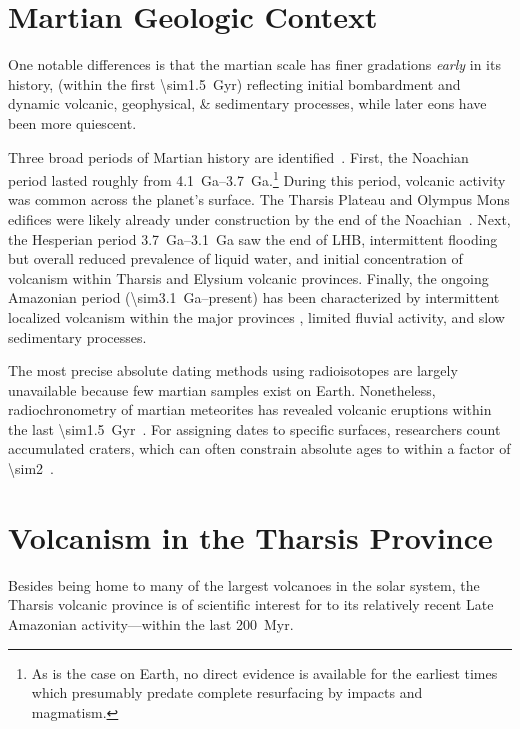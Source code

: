 \section{Martian Geologic Context}

One notable differences is that the martian scale has finer gradations \textit{early} in its history, (within the first \qty{\sim1.5}{Gyr}) reflecting initial bombardment and dynamic volcanic, geophysical, \& sedimentary processes, while later eons have been more quiescent. 

Three broad periods of Martian history are identified~\parencite{carr_geologic_2010}. First, the Noachian period lasted roughly from \qtyrange{4.1}{3.7}{Ga}.\footnote{As is the case on Earth, no direct evidence is available for the earliest times which presumably predate complete resurfacing by impacts and magmatism.} During this period, volcanic activity was common across the planet's surface. The Tharsis Plateau and Olympus Mons edifices were likely already under construction by the end of the Noachian~\parencite[cf.][]{isherwood_volcanic_2013,broquet_gravitational_2019}. Next, the Hesperian period \qtyrange{3.7}{3.1}{Ga} saw the end of \ac{LHB}, intermittent flooding but overall reduced prevalence of liquid water, and initial concentration of volcanism within Tharsis and Elysium volcanic provinces. Finally, the ongoing Amazonian period (\qty{\sim3.1}{Ga}--present) has been characterized by intermittent localized volcanism within the major provinces \parencite[e.g.,][]{grott_long-term_2013}, limited fluvial activity, and slow sedimentary processes.

The most precise absolute dating methods using radioisotopes are largely unavailable because few martian samples exist on Earth. Nonetheless, radiochronometry of martian meteorites has revealed volcanic eruptions within the last \qty{\sim1.5}{Gyr}~\parencite[e.g.,][]{cohen_taking_2017}. For assigning dates to specific surfaces, researchers count accumulated craters, which can often constrain absolute ages to within a factor of \num{\sim2}~\parencite[e.g.,][]{kneissl_map-projection-independent_2011}.

\section{Volcanism in the Tharsis Province}

Besides being home to many of the largest volcanoes in the solar system, the Tharsis volcanic province is of scientific interest for to its relatively recent Late Amazonian activity---within the last \qty{200}{Myr}.


